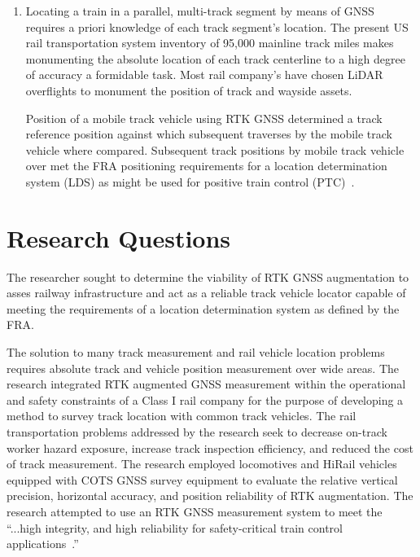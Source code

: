 \begin{enumerate}[1)]
	\item Locating a train in a parallel, multi-track segment by means of GNSS requires a priori knowledge of each track segment's location. The present US rail transportation system inventory of 95,000 mainline track miles makes monumenting the absolute location of each track centerline to a high degree of accuracy a formidable task. Most rail company's have chosen LiDAR overflights to monument the position of track and wayside assets.
	
	Position of a mobile track vehicle using RTK GNSS determined a track reference position against which subsequent traverses by the mobile track vehicle where compared. Subsequent track positions by mobile track vehicle over met the FRA positioning requirements for a location determination system (LDS) as might be used for positive train control (PTC)~\citep[pp.3]{1995FRADiffe}.

\end{enumerate}  


\section{Research Questions}
The researcher sought to determine the viability of RTK GNSS augmentation to asses railway infrastructure and act as a reliable track vehicle locator capable of meeting the requirements of a location determination system as defined by the FRA. 

The solution to many track measurement and rail vehicle location problems requires absolute track and vehicle position measurement over wide areas. The research integrated RTK augmented GNSS measurement within the operational and safety constraints of a Class I rail company for the purpose of developing a method to survey track location with common track vehicles. The rail transportation problems addressed by the research seek to decrease on-track worker hazard exposure, increase track inspection efficiency, and reduced the cost of track measurement. The research employed locomotives and HiRail vehicles equipped with COTS GNSS survey equipment to evaluate the relative vertical precision, horizontal accuracy, and position reliability of RTK augmentation. The research attempted to use an RTK GNSS measurement system to meet the ``...high integrity, and high reliability for safety-critical train control applications~\citep[pp.11]{2008USDoT_NDGPS}.''

